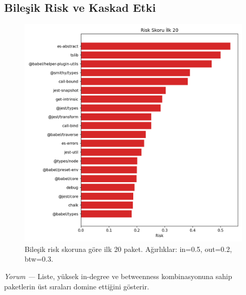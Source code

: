\documentclass[11pt,a4paper]{article}
\begin{document}
\subsection{Bileşik Risk ve Kaskad Etki}
\begin{figure}[H]
  \centering
  \includegraphics{top20_risk.png}
  \caption{Bileşik risk skoruna göre ilk 20 paket. Ağırlıklar: in=0.5, out=0.2, btw=0.3.}
\end{figure}
\textit{Yorum —} Liste, yüksek in-degree ve betweenness kombinasyonuna sahip paketlerin üst sıraları domine ettiğini gösterir.
\end{document}
